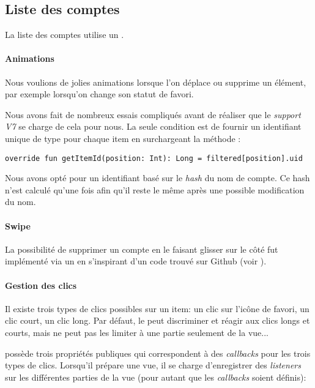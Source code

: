 \subsection{Liste des comptes}

La liste des comptes utilise un . 

\paragraph*{Animations} Nous voulions de jolies animations lorsque l'on déplace ou supprime un élément, par exemple lorsqu'on change son statut de favori. 

Nous avons fait de nombreux essais compliqués avant de réaliser que le \emph{support V7} se charge de cela pour nous. La seule condition est de fournir un identifiant unique de type  pour chaque item en surchargeant la méthode :
\begin{verbatim}
override fun getItemId(position: Int): Long = filtered[position].uid
\end{verbatim}

Nous avons opté pour un identifiant basé sur le \emph{hash} du nom de compte. Ce hash n'est calculé qu'une fois afin qu'il reste le même après une possible modification du nom.

\paragraph*{Swipe} La possibilité de supprimer un compte en le faisant glisser sur le côté fut implémenté via un  en s'inspirant d'un code trouvé sur Github (voir ).  

\paragraph*{Gestion des clics} Il existe trois types de clics possibles sur un item: un clic sur l'icône de favori, un clic court, un clic long. Par défaut, le  peut discriminer et réagir aux clics longs et courts, mais ne peut pas les limiter à une partie seulement de la vue... 

 possède trois propriétés publiques qui correspondent à des \emph{callbacks} pour les trois types de clics. Lorsqu'il prépare une vue, il se charge d'enregistrer des \emph{listeners} sur les différentes parties de la vue (pour autant que les \emph{callbacks} soient définis):

